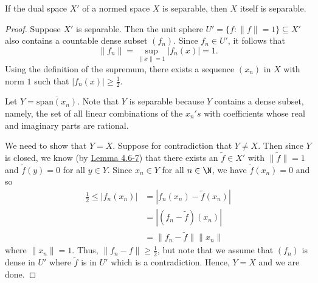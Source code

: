 \begin{theorem}[Separability]
    If the dual space \( X' \) of a normed space \( X  \) is separable, then \( X  \) itself is separable.
\end{theorem} 
\begin{proof}
Suppose \( X' \) is separable. Then the unit sphere \( U' = \{ f : \|f\| = 1  \} \subseteq  X'  \) also contains a countable dense subset \( ({f}_{n}) \). Since \( {f}_{n} \in U' \), it follows that  
\[  \|{f}_{n}\| = \sup_{\|x\| = 1} | {f}_{n}(x) |  = 1.  \]
Using the definition of the supremum, there exists a sequence \( ({x}_{n}) \) in \( X  \) with norm \( 1  \) such that \( | {f}_{n}(x) |  \geq \frac{ 1 }{ 2 }  \). 

Let \( Y = \overline{\text{span}({x}_{n})}  \). Note that \( Y  \) is separable because \( Y \) contains a dense subset, namely, the set of all linear combinations of the \( {x}_{n}'s \) with coefficients whose real and imaginary parts are rational.  

We need to show that \( Y = X  \). Suppose for contradiction that \( Y \neq X  \). Then since \( Y  \) is closed, we know (by {\hyperref[4.67]{Lemma 4.6-7}}) that there exists an \( \tilde{f} \in X' \) with \( \|\tilde{f}\| =1  \) and \( \tilde{f}(y) = 0  \) for all \( y \in Y  \). Since \( {x}_{n} \in Y  \) for all \( n \in \N \), we have \( \tilde{f}({x}_{n}) = 0  \) and so
\begin{align*}
    \frac{ 1 }{ 2 }  \leq | {f}_{n}({x}_{n}) |  &= | {f}_{n}({x}_{n}) - \tilde{f}({x}_{n}) |  \\
                                                &= | ({f}_{n}-\tilde{f})({x}_{n}) |  \\
                                                &= \|{f}_{n} - \tilde{f}\| \|{x}_{n}\|
\end{align*}
where \( \|{x}_{n}\| = 1  \). Thus, \( \|{f}_{n} - f\| \geq \frac{ 1 }{ 2 }  \), but note that we assume that \( ({f}_{n}) \) is dense in \( U' \) where \( \tilde{f} \) is in \( U' \) which is a contradiction. Hence, \( Y = X  \) and we are done.
\end{proof}



